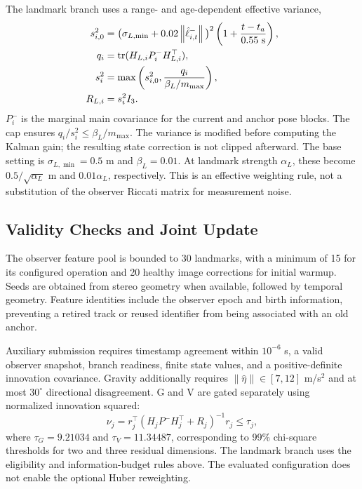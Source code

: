 \documentclass[a4paper,runningheads,twocolumn]{llncs}
\newcommand{\tr}{\operatorname{tr}}
\newcommand{\norm}[1]{\left\lVert #1\right\rVert}
\begin{document}
The landmark branch uses a range- and age-dependent effective variance,
\begin{align}
 s_{i,0}^2&=\big(\sigma_{L,\min}+0.02\norm{\hat\ell_{i,t}^{-}}\big)^2
       \left(1+\frac{t-t_a}{0.55~\mathrm{s}}\right),\\
 q_i&=\tr(H_{L,i}P_i^-H_{L,i}^{\top}),\notag\\
 s_i^2&=\max\left(s_{i,0}^2,\frac{q_i}{\beta_L/m_{\max}}\right),\notag\\
 R_{L,i}&=s_i^2 I_3 .
 \label{eq:lbudget}
\end{align}
$P_i^-$ is the marginal main covariance for the current and anchor pose blocks. The cap ensures $q_i/s_i^2\leq\beta_L/m_{\max}$. The variance is modified before computing the Kalman gain; the resulting state correction is not clipped afterward. The base setting is $\sigma_{L,\min}=0.5$ m and $\beta_L=0.01$. At landmark strength $\alpha_L$, these become $0.5/\sqrt{\alpha_L}$ m and $0.01\alpha_L$, respectively. This is an effective weighting rule, not a substitution of the observer Riccati matrix for measurement noise.

\subsection{Validity Checks and Joint Update}
The observer feature pool is bounded to 30 landmarks, with a minimum of 15 for its configured operation and 20 healthy image corrections for initial warmup. Seeds are obtained from stereo geometry when available, followed by temporal geometry. Feature identities include the observer epoch and birth information, preventing a retired track or reused identifier from being associated with an old anchor.

Auxiliary submission requires timestamp agreement within $10^{-6}$ s, a valid observer snapshot, branch readiness, finite state values, and a positive-definite innovation covariance. Gravity additionally requires $\norm{\hat\eta}\in[7,12]$ m/s$^2$ and at most $30^\circ$ directional disagreement. G and V are gated separately using normalized innovation squared:
\begin{equation}
 \nu_j=r_j^\top(H_jP^-H_j^\top+R_j)^{-1}r_j\leq\tau_j ,
 \label{eq:nis}
\end{equation}
where $\tau_G=9.21034$ and $\tau_V=11.34487$, corresponding to 99\% chi-square thresholds for two and three residual dimensions. The landmark branch uses the eligibility and information-budget rules above. The evaluated configuration does not enable the optional Huber reweighting.
\end{document}

